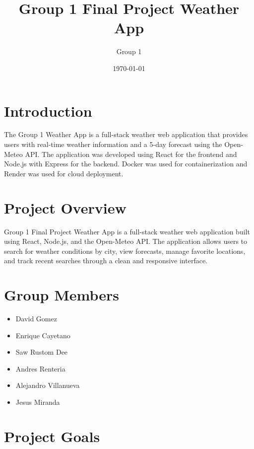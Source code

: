 \documentclass{article}
\title{Group 1 Final Project Weather App}
\author{Group 1}
\date{\today}
\begin{document}
\maketitle

\tableofcontents
\newpage

\section{Introduction}

The Group 1 Weather App is a full-stack weather web application that provides users with real-time weather information and a 5-day forecast using the Open-Meteo API. The application was developed using React for the frontend and Node.js with Express for the backend. Docker was used for containerization and Render was used for cloud deployment.

\section{Project Overview}

Group 1 Final Project Weather App is a full-stack weather web application built using React, Node.js, and the Open-Meteo API. The application allows users to search for weather conditions by city, view forecasts, manage favorite locations, and track recent searches through a clean and responsive interface.

\section{Group Members}

\begin{itemize}[leftmargin=*]
    \item David Gomez
    \item Enrique Cayetano
    \item Saw Rustom Dee
    \item Andres Renteria
    \item Alejandro Villanueva
    \item Jesus Miranda
\end{itemize}

\section{Project Goals}
\end{document}
